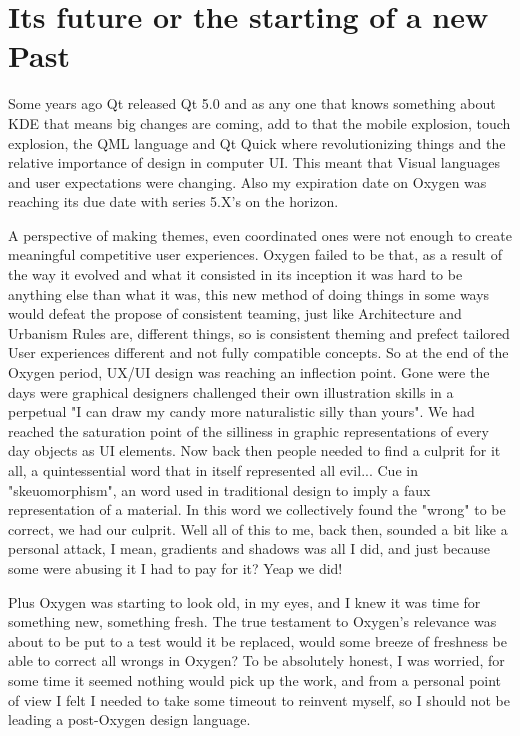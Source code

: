 \section*{Its future or the starting of a new Past}
Some years ago Qt released Qt 5.0 and as any one that knows something about KDE that means big changes are coming, add to that the mobile explosion, touch explosion, the QML language and Qt Quick where revolutionizing things and the relative importance of design in computer UI. 
This meant that Visual languages and user expectations were changing. Also my expiration date on Oxygen was reaching its due date with series 5.X's on the horizon.

A perspective of making themes, even coordinated ones were not enough to create meaningful competitive user experiences.        
Oxygen failed to be that, as a result of the way it evolved and what it consisted in its inception it was hard to be anything else than what it was, this new method of doing things in some ways would defeat the propose of consistent teaming, just like Architecture and Urbanism Rules are, different things, so is consistent theming and prefect tailored User experiences different and not fully compatible concepts.    
So at the end of the Oxygen period, UX/UI design was reaching an inflection point. Gone were the days were graphical designers challenged their own illustration skills in a perpetual "I can draw my candy more naturalistic silly than yours".
We had reached the saturation point of the silliness in graphic representations of every day objects as UI elements. Now back then people needed to find a culprit for it all, a quintessential word that in itself represented all evil... Cue in "skeuomorphism", an word used in traditional design to imply a faux representation of a material. In this word we collectively found the "wrong" to be correct, we had our culprit.
Well all of this to me, back then, sounded a bit like a personal attack, I mean, gradients and shadows was all I did, and just because some were abusing it I had to pay for it? Yeap we did!

Plus Oxygen was starting to look old, in my eyes, and I knew it was time for something new, something fresh. 
The true testament to Oxygen's relevance was about to be put to a test would it be replaced, would some breeze of freshness be able to correct all wrongs in Oxygen?
To be absolutely honest, I was worried, for some time it seemed nothing would pick up the work, and from a personal point of view I felt I needed to take some timeout to reinvent myself, so I should not be leading a post-Oxygen design language.


